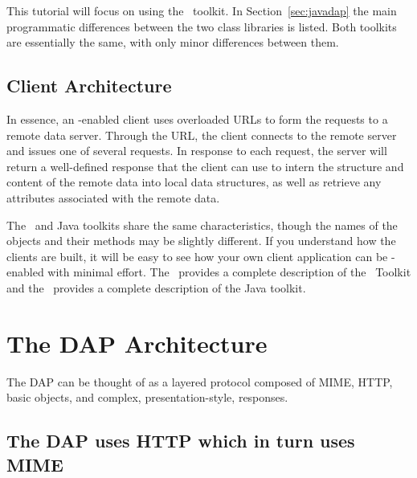 \documentclass{dods-paper}
\begin{document}
This tutorial will focus on using the \Cpp\ toolkit. In
Section~\ref{sec:javadap} the main programmatic differences between the two
class libraries is listed. Both toolkits are essentially the same, with only
minor differences between them.

\subsection{Client Architecture}  

In essence, an \opendap-enabled client uses overloaded URLs to form the 
requests to a remote data server.  Through the URL, the client connects to 
the remote server and issues one of several requests.   In response to
each request, the server will return a well-defined response that the client
can use to intern the structure and content of the remote data into local
data structures, as well as retrieve any attributes associated with the
remote data.

The \Cpp\ and Java toolkits share the same characteristics, though the
names of the objects and their methods may be slightly different. If
you understand how the clients are built, it will be easy to see how
your own client application can be \opendap-enabled with minimal
effort.  The \OPDapi\ provides a complete description of the \Cpp\
Toolkit and the \OPDjavaUrl\ provides a complete description of the
Java toolkit.

\section{The DAP Architecture}

The DAP can be thought of as a layered protocol composed of MIME, HTTP, basic
objects, and complex, presentation-style, responses.

\subsection{The DAP uses HTTP which in turn uses MIME}
\end{document}
